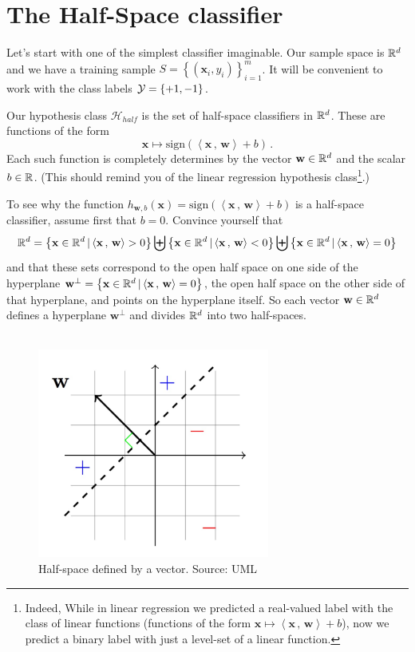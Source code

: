 \documentclass[11pt]{article}
\newcommand{\Hc}{\mathcal{H}}
\newcommand{\innerr}[2]{{\left\langle #1\,,\,#2 \right\rangle}}
\newcommand{\VV}[1]{\mathbf{#1}}
\begin{document}

\section{The Half-Space classifier}

Let's start with one of the simplest classifier imaginable. Our sample space is
$\mathbb{R}^d$ and we have a training sample $S=\left\{ \left( \VV{x}_i,y_i \right)
\right\}_{i=1}^m$. It will be convenient to work with the class labels
$\mathcal{Y}=\left\{ +1,-1 \right\}$. 

Our hypothesis class $\Hc_{half}$ is the set of half-space classifiers in
$\mathbb{R}^d$. These are functions of the form
\[
\VV{x} \mapsto \text{sign}\left( \innerr{\VV{x}}{\VV{w}} + b \right)\,.
\]
Each such function is completely determines by the vector $\VV{w}\in\reals^d$
and the scalar $b\in\mathbb{R}$. (This should remind you of the linear regression
  hypothesis class\footnote{Indeed, While in linear regression we predicted a
  real-valued label with the class
  of linear functions (functions of the form $\VV{x} \mapsto
  \innerr{\VV{x}}{\VV{w}} + b$), now we predict a binary label with just a
level-set of a linear function.}.)

To see why the function $h_{\VV{w},b}(\VV{x}) = \text{sign}\left(
\innerr{\VV{x}}{\VV{w}} + b \right)$ is a half-space classifier, assume first
that $b=0$. Convince yourself that 
\[
  \reals^d = \left\{ \VV{x}\in\reals^d \,|\, \innerr{\VV{x}}{\VV{w}} > 0 \right\} \biguplus 
  \left\{ \VV{x}\in\reals^d \,|\, \innerr{\VV{x}}{\VV{w}} < 0 \right\} \biguplus 
  \left\{ \VV{x}\in\reals^d \,|\, \innerr{\VV{x}}{\VV{w}} = 0 \right\}
\]
and that these sets correspond to the open half space on one side of the
hyperplane $\VV{w}^\perp = \left\{ \VV{x}\in\reals^d \,|\, \innerr{\VV{x}}{\VV{w}} = 0
\right\}$, the open half space on the other side of that hyperplane, and points
on the hyperplane itself. So each vector $\VV{w}\in\reals^d$ defines a
hyperplane $\VV{w}^\perp$ and divides $\mathbb{R}^d$ into two half-spaces. 
\\~\\
\begin{figure}[h!]
  \centering
  \includegraphics[width=3in]{half.pdf}
  \caption{Half-space defined by a vector. Source: UML}
\end{figure}
\end{document}
